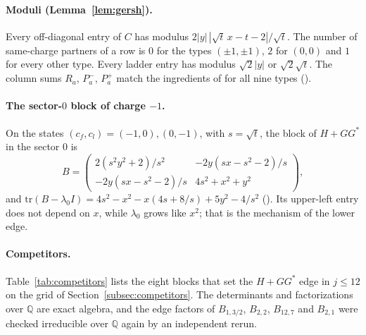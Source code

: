 \documentclass[11pt]{article}
\theoremstyle{definition}
\theoremstyle{remark}
\begin{document}
\paragraph{Moduli (Lemma~\ref{lem:gersh}).} Every off-diagonal entry of $C$ has modulus $2|y|\,|\sqrt t\,x-t-2|/\sqrt t$.
The number of same-charge partners of a row is $0$ for the types $(\pm1,\pm1)$, $2$ for $(0,0)$ and $1$ for every other
type. Every ladder entry has modulus $\sqrt2|y|$ or $\sqrt2\sqrt t$. The column sums $R_a$, $P^-_a$, $P^+_a$ match the
ingredients of  for all nine types ().

\paragraph{The sector-$0$ block of charge $-1$.}\label{app:lowblock} On the states $(c_f,c_l)=(-1,0),(0,-1)$, with
$s=\sqrt t$, the block of $H+GG^*$ in the sector $0$ is
\[
  B=\begin{pmatrix} 2(s^2y^2+2)/s^2 & -2y(sx-s^2-2)/s\\[2pt] -2y(sx-s^2-2)/s & 4s^2+x^2+y^2\end{pmatrix},
\]
and $\mathrm{tr}(B-\lambda_0I)=4s^2-x^2-x(4s+8/s)+5y^2-4/s^2$ (). Its upper-left entry
does not depend on $x$, while $\lambda_0$ grows like $x^2$; that is the mechanism of the lower edge.

\paragraph{Competitors.} Table~\ref{tab:competitors} lists the eight blocks that set the $H+GG^*$ edge in $j\le12$ on
the grid of Section~\ref{subsec:competitors}. The determinants and factorizations over $\mathbb Q$ are exact algebra, and
the edge factors of $B_{1,3/2}$, $B_{2,2}$, $B_{12,7}$ and $B_{2,1}$ were checked irreducible over $\mathbb Q$ again by an
independent rerun.
\end{document}
